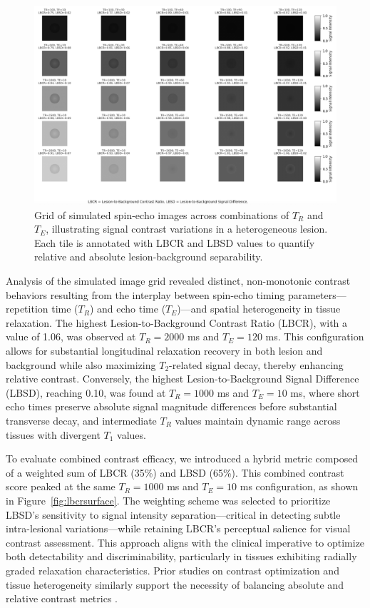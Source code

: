\documentclass[10pt,a4paper,twoside]{article}
\begin{document}
\begin{figure}[htbp!]
\centering
\includegraphics[width=\textwidth]{lbcrlbsdmatrix.png}
\caption{Grid of simulated spin-echo images across combinations of \( T_R \) and \( T_E \), illustrating signal contrast variations in a heterogeneous lesion. Each tile is annotated with LBCR and LBSD values to quantify relative and absolute lesion-background separability.}
\label{fig:grid}
\end{figure}

Analysis of the simulated image grid revealed distinct, non-monotonic contrast behaviors resulting from the interplay between spin-echo timing parameters—repetition time (\( T_R \)) and echo time (\( T_E \))—and spatial heterogeneity in tissue relaxation. The highest Lesion-to-Background Contrast Ratio (LBCR), with a value of 1.06, was observed at \( T_R = 2000 \) ms and \( T_E = 120 \) ms. This configuration allows for substantial longitudinal relaxation recovery in both lesion and background while also maximizing \( T_2 \)-related signal decay, thereby enhancing relative contrast. Conversely, the highest Lesion-to-Background Signal Difference (LBSD), reaching 0.10, was found at \( T_R = 1000 \) ms and \( T_E = 10 \) ms, where short echo times preserve absolute signal magnitude differences before substantial transverse decay, and intermediate \( T_R \) values maintain dynamic range across tissues with divergent \( T_1 \) values.

To evaluate combined contrast efficacy, we introduced a hybrid metric composed of a weighted sum of LBCR (35\%) and LBSD (65\%). This combined contrast score peaked at the same \( T_R = 1000 \) ms and \( T_E = 10 \) ms configuration, as shown in Figure~\ref{fig:lbcrsurface}. The weighting scheme was selected to prioritize LBSD’s sensitivity to signal intensity separation—critical in detecting subtle intra-lesional variations—while retaining LBCR’s perceptual salience for visual contrast assessment. This approach aligns with the clinical imperative to optimize both detectability and discriminability, particularly in tissues exhibiting radially graded relaxation characteristics. Prior studies on contrast optimization and tissue heterogeneity similarly support the necessity of balancing absolute and relative contrast metrics \cite{tofts2003, does2002, xu2009}.
\end{document}
